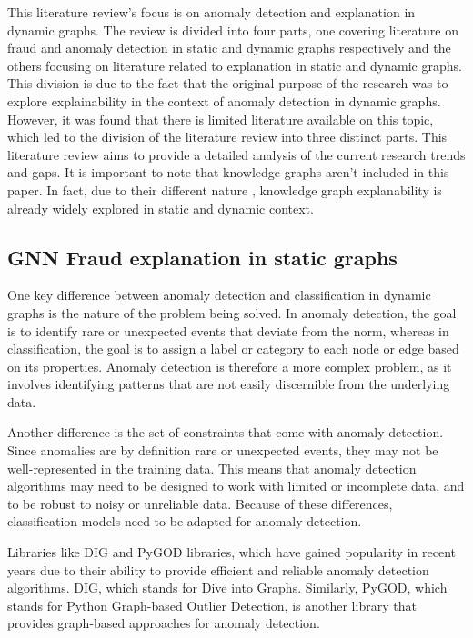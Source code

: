 This literature review's focus is on anomaly detection and explanation in dynamic graphs. The review is divided into four parts, one covering literature on fraud and anomaly detection in static and dynamic graphs respectively and the others focusing on literature related to explanation in static and dynamic graphs. This division is due to the fact that the original purpose of the research was to explore explainability in the context of anomaly detection in dynamic graphs. However, it was found that there is limited literature available on this topic, which led to the division of the literature review into three distinct parts. This literature review aims to provide a detailed analysis of the current research trends and gaps.
It is important to note that knowledge graphs aren't included in this paper. In fact, due to their different nature , knowledge graph explanability is already widely explored in static and dynamic context.

\subsection{GNN Fraud explanation in static graphs}
One key difference between anomaly detection and classification in dynamic graphs is the nature of the problem being solved. In anomaly detection, the goal is to identify rare or unexpected events that deviate from the norm, whereas in classification, the goal is to assign a label or category to each node or edge based on its properties. Anomaly detection is therefore a more complex problem, as it involves identifying patterns that are not easily discernible from the underlying data.

Another difference is the set of constraints that come with anomaly detection. Since anomalies are by definition rare or unexpected events, they may not be well-represented in the training data. This means that anomaly detection algorithms may need to be designed to work with limited or incomplete data, and to be robust to noisy or unreliable data. Because of these differences, classification models need to be adapted for anomaly detection.

Libraries like DIG and PyGOD libraries, which have gained popularity in recent years due to their ability to provide efficient and reliable anomaly detection algorithms. DIG, which stands for Dive into Graphs. Similarly, PyGOD, which stands for Python Graph-based Outlier Detection, is another library that provides graph-based approaches for anomaly detection. 

